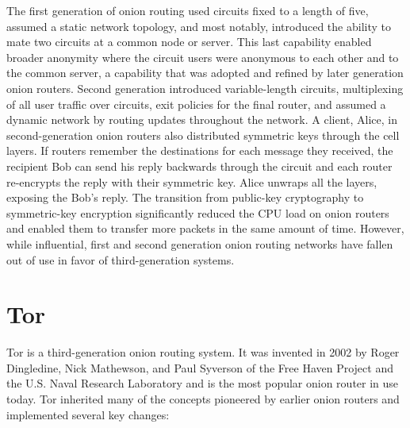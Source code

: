 The first generation of onion routing used circuits fixed to a length of five, assumed a static network topology, and most notably, introduced the ability to mate two circuits at a common node or server. This last capability enabled broader anonymity where the circuit users were anonymous to each other and to the common server, a capability that was adopted and refined by later generation onion routers. Second generation introduced variable-length circuits, multiplexing of all user traffic over circuits, exit policies for the final router, and assumed a dynamic network by routing updates throughout the network. A client, Alice, in second-generation onion routers also distributed symmetric keys through the cell layers. If routers remember the destinations for each message they received, the recipient Bob can send his reply backwards through the circuit and each router re-encrypts the reply with their symmetric key. Alice unwraps all the layers, exposing the Bob's reply. The transition from public-key cryptography to symmetric-key encryption significantly reduced the CPU load on onion routers and enabled them to transfer more packets in the same amount of time. However, while influential, first and second generation onion routing networks have fallen out of use in favor of third-generation systems.\cite{syverson2011peel}

\section{Tor}

Tor is a third-generation onion routing system. It was invented in 2002 by Roger Dingledine, Nick Mathewson, and Paul Syverson of the Free Haven Project and the U.S. Naval Research Laboratory\cite{dingledine2004tor} and is the most popular onion router in use today. Tor inherited many of the concepts pioneered by earlier onion routers and implemented several key changes:\cite{syverson2011peel}\cite{dingledine2004tor}

